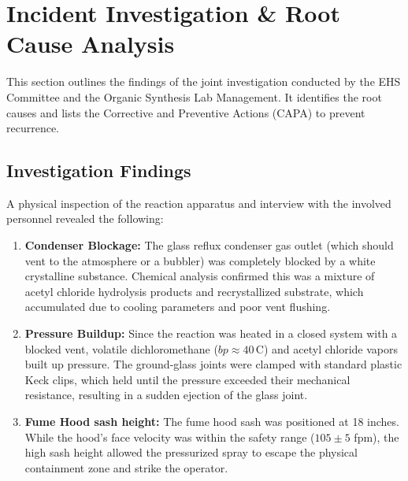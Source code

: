 \section{Incident Investigation \& Root Cause Analysis}
\thinrule

\vspace{0.5em}

This section outlines the findings of the joint investigation conducted by the EHS Committee and the Organic Synthesis Lab Management. It identifies the root causes and lists the Corrective and Preventive Actions (CAPA) to prevent recurrence.

\subsection{Investigation Findings}
A physical inspection of the reaction apparatus and interview with the involved personnel revealed the following:
\begin{enumerate}
    \item \textbf{Condenser Blockage:} The glass reflux condenser gas outlet (which should vent to the atmosphere or a bubbler) was completely blocked by a white crystalline substance. Chemical analysis confirmed this was a mixture of acetyl chloride hydrolysis products and recrystallized substrate, which accumulated due to cooling parameters and poor vent flushing.
    \item \textbf{Pressure Buildup:} Since the reaction was heated in a closed system with a blocked vent, volatile dichloromethane ($bp \approx 40$\,\textdegree{}C) and acetyl chloride vapors built up pressure. The ground-glass joints were clamped with standard plastic Keck clips, which held until the pressure exceeded their mechanical resistance, resulting in a sudden ejection of the glass joint.
    \item \textbf{Fume Hood sash height:} The fume hood sash was positioned at 18 inches. While the hood's face velocity was within the safety range ($105 \pm 5$ fpm), the high sash height allowed the pressurized spray to escape the physical containment zone and strike the operator.
\end{enumerate}

